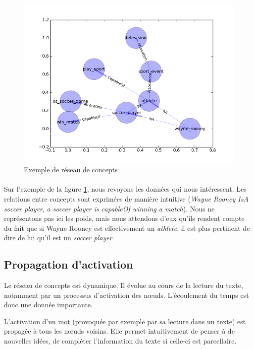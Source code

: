 \documentclass[a4paper, 12pt]{article}
\begin{document}
\begin{figure}[h]
 \centering
 \includegraphics[width=14cm]{./rc_exemple.png}
 \caption{Exemple de réseau de concepts}
 \label{fig:rc_exemple}
\end{figure}

\paragraph{}
Sur l'exemple de la figure \ref{fig:rc_exemple}, nous revoyons les données qui nous intéressent. Les relations entre concepts sont exprimées de manière intuitive (\textit{Wayne Rooney IsA soccer player}, \textit{a soccer player is capableOf winning a match}). Nous ne représentons pas ici les poids, mais nous attendons d'eux qu'ils rendent compte du fait que si Wayne Rooney est effectivement un \textit{athlete}, il est plus pertinent de dire de lui qu'il est un \textit{soccer player}.


\subsection{Propagation d'activation}

Le réseau de concepts est dynamique. Il évolue au cours de la lecture du texte, notamment par un processus d'activation des n\oe uds. L'écoulement du temps est donc une donnée importante.

L'activation d'un mot (provoquée par exemple par sa lecture dans un texte) est propagée à tous les n\oe uds voisins. Elle permet intuitivement de penser à de nouvelles idées, de compléter l'information du texte si celle-ci est parcellaire.
\end{document}
